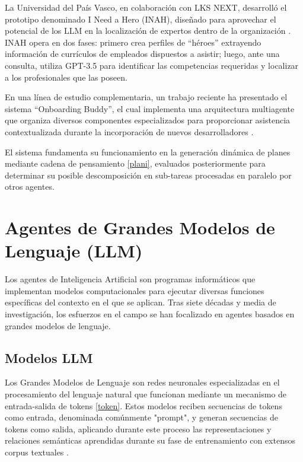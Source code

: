La Universidad del País Vasco, en colaboración con LKS NEXT, desarrolló el prototipo denominado I Need a Hero (INAH), diseñado para aprovechar el potencial de los LLM en la localización de expertos dentro de la organización \cite{azanza_can_2024}. INAH opera en dos fases: primero crea perfiles de ``héroes'' extrayendo información de currículos de empleados dispuestos a asistir; luego, ante una consulta, utiliza GPT-3.5 para identificar las competencias requeridas y localizar a los profesionales que las poseen.

En una línea de estudio complementaria, un trabajo reciente ha presentado el sistema ``Onboarding Buddy'', el cual implementa una arquitectura multiagente que organiza diversos componentes especializados para proporcionar asistencia contextualizada durante la incorporación de nuevos desarrolladores \cite{ionescu_multi-agent_2025}.

El sistema fundamenta su funcionamiento en la generación dinámica de planes mediante cadena de pensamiento \ref{plani}, evaluados posteriormente para determinar su posible descomposición en sub-tareas procesadas en paralelo por otros agentes.

\section{Agentes de Grandes Modelos de Lenguaje (LLM)}

Los agentes de Inteligencia Artificial son programas informáticos que implementan modelos computacionales para ejecutar diversas funciones específicas del contexto en el que se aplican. Tras siete décadas y media de investigación, los esfuerzos en el campo se han focalizado en agentes basados en grandes modelos de lenguaje. 

\subsection{Modelos LLM}

Los Grandes Modelos de Lenguaje son redes neuronales especializadas en el procesamiento del lenguaje natural que funcionan mediante un mecanismo de entrada-salida de tokens \ref{token}. Estos modelos reciben secuencias de tokens como entrada, denominada comúnmente "prompt", y generan secuencias de tokens como salida, aplicando durante este proceso las representaciones y relaciones semánticas aprendidas durante su fase de entrenamiento con extensos corpus textuales  \cite{vaswani_attention_2023}.

